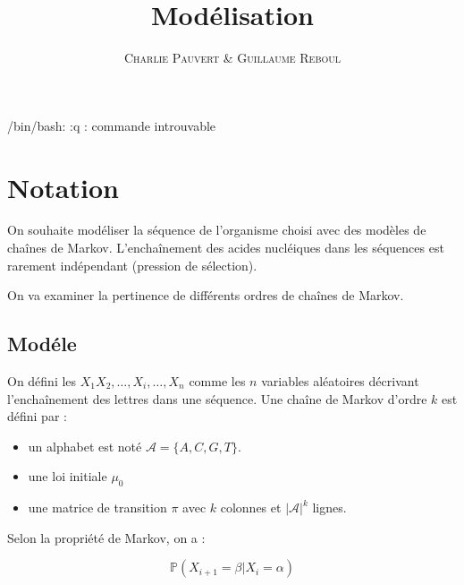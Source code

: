 \documentclass[12pt,a4paper]{article}
\title{Modélisation}
\author{\textsc{Charlie Pauvert} \& \textsc{Guillaume Reboul}}
\begin{document}
/bin/bash: :q : commande introuvable
\section{Notation }

On souhaite modéliser la séquence de l'organisme choisi avec des modèles de chaînes de Markov. 
L'enchaînement des acides nucléiques dans les séquences est rarement indépendant (pression de sélection).

On va examiner la pertinence de différents ordres de chaînes de Markov. 


\subsection{Modéle}

On défini les $X_1X_2, \dots, X_i, \dots, X_n$ comme les $n$ variables aléatoires décrivant l'enchaînement des lettres dans une séquence.
Une chaîne de Markov d'ordre $k$ est défini par : 

\begin{itemize}
\item un alphabet est noté $\mathcal{A} = \{A,C,G,T\}$.
\item une loi initiale $\mu_0$
\item une matrice de transition $\pi$ avec $k$ colonnes et $|\mathcal{A}|^k$ lignes.
\end{itemize}

Selon la propriété de Markov, on a  : 

\[
\mathbb{P}(X_{i+1} = \beta | X_i = \alpha ) 
\]
\end{document}
